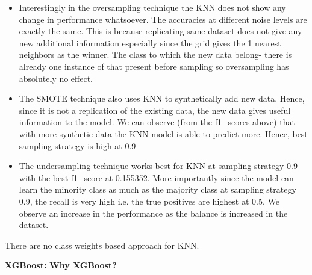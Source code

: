 \documentclass[fleqn,10pt]{SelfArx} %
\begin{document}
\begin{itemize}
\begin{itemize}
\item Interestingly in the oversampling technique the KNN does not show any change in performance whatsoever. The accuracies at different noise levels are exactly the same. This is because replicating same dataset does not give any new additional information especially since the grid gives the 1 nearest neighbors as the winner. The class to which the new data belong- there is already one instance of that present before sampling so oversampling has absolutely no effect.\\
\bigbreak
\noindent
\end{itemize}
\begin{itemize}
\item The SMOTE technique also uses KNN to synthetically add new data. Hence, since it is not a replication of the existing data, the new data gives useful information to the model. We can observe (from the f1_scores above) that with more synthetic data the KNN model is able to predict more. Hence, best sampling strategy is high at 0.9\\
\bigbreak
\noindent
\item The undersampling technique works best for KNN at sampling strategy 0.9 with the best f1_score at 0.155352. More importantly since the model can learn the minority class as much as the majority class at sampling strategy 0.9, the recall is very high i.e. the true positives are highest at 0.5. We observe an increase in the performance as the balance is increased in the dataset.

\bigbreak
\noindent
\end{itemize}



There are no class weights based approach for KNN.

\pagebreak
\noindent
\textbf{XGBoost: }
\bigbreak
\noindent
\textbf{Why XGBoost?}
\bigbreak
\noindent


\end{itemize}
\end{document}
